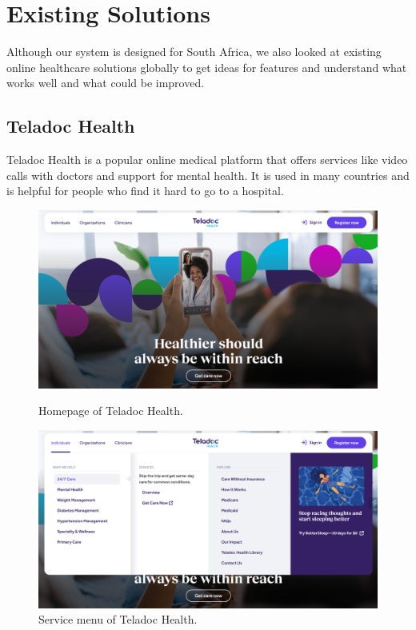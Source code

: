 \section{Existing Solutions}
\label{sec:existing-solutions}

Although our system is designed for South Africa, we also looked at existing online healthcare solutions globally to get ideas for features and understand what works well and what could be improved.

\subsection{Teladoc Health}
Teladoc Health is a popular online medical platform \cite{teladocwebsite} that offers services like video calls with doctors and support for mental health. It is used in many countries and is helpful for people who find it hard to go to a hospital.

\begin{figure}[htbp]
    \centering
    \begin{minipage}[b]{0.47\textwidth}
        \centering
        \includegraphics[width=\textwidth]{../../images/telodocHome.png}
        \caption{Homepage of Teladoc Health.}
        \label{fig:teladoc-home}
    \end{minipage}
    \hfill
    \begin{minipage}[b]{0.47\textwidth}
        \centering
        \includegraphics[width=\textwidth]{../../images/telodocServices.png}
        \caption{Service menu of Teladoc Health.}
        \label{fig:teladoc-services}
    \end{minipage}
\end{figure}

